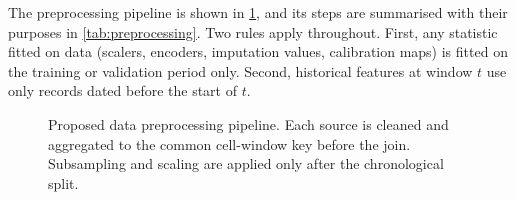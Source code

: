 The preprocessing pipeline is shown in \cref{fig:preprocessing}, and its steps are summarised with their purposes in \cref{tab:preprocessing}. Two rules apply throughout. First, any statistic fitted on data (scalers, encoders, imputation values, calibration maps) is fitted on the training or validation period only. Second, historical features at window $t$ use only records dated before the start of $t$.

\begin{figure}[t]
\centering

\caption{Proposed data preprocessing pipeline. Each source is cleaned and aggregated to the common cell-window key before the join. Subsampling and scaling are applied only after the chronological split.}
\label{fig:preprocessing}
\end{figure}

